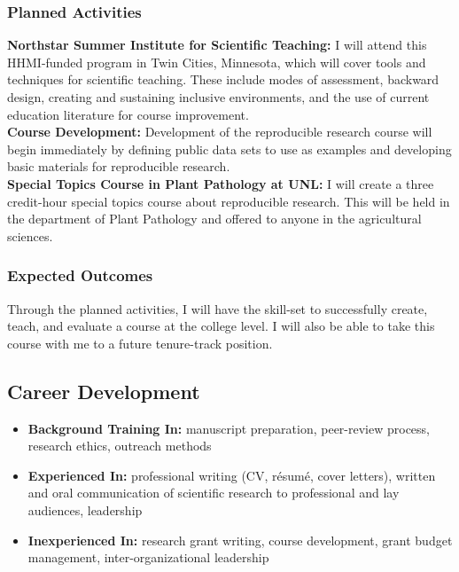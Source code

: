 \documentclass[12pt,letterpaper]{article}
\begin{document}
\subsubsection*{Planned Activities}

\noindent \textbf{Northstar Summer Institute for Scientific Teaching:} I will attend this HHMI-funded program in Twin Cities, Minnesota, which will cover tools and techniques for scientific teaching. These include modes of assessment, backward design, creating and sustaining inclusive environments, and the use of current education literature for course improvement.\\
\noindent \textbf{Course Development:} Development of the reproducible research course will begin immediately by defining public data sets to use as examples and developing basic materials for reproducible research.\\
\noindent \textbf{Special Topics Course in Plant Pathology at UNL:} I will create a three credit-hour special topics course about reproducible research. This will be held in the department of Plant Pathology and offered to anyone in the agricultural sciences. 

\subsubsection*{Expected Outcomes}

Through the planned activities, I will have the skill-set to successfully create, teach, and evaluate a course at the college level. I will also be able to take this course with me to a future tenure-track position. 

\subsection{Career Development}

\begin{itemize}
  \item \textbf{Background Training In:} 
  manuscript preparation, peer-review process, research ethics, outreach methods
  \item \textbf{Experienced In:} 
  professional writing (CV, r\'esum\'e, cover letters), written and oral communication of scientific research to professional and lay audiences, leadership
  \item \textbf{Inexperienced In:} research grant writing, course development, grant budget management, inter-organizational leadership
\end{itemize}
\end{document}
